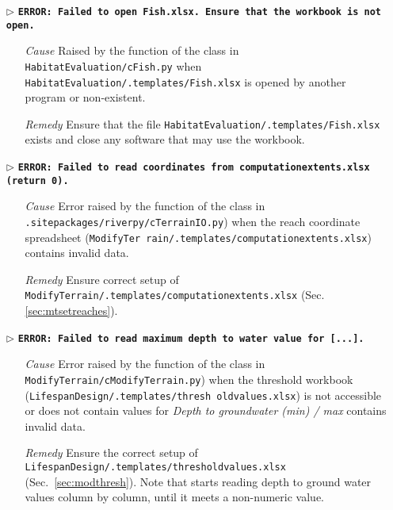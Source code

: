 \begin{itemize}
	\item[$\triangleright$]\textbf{\texttt{ERROR: Failed to open Fish.xlsx. Ensure that the workbook is not open.}}
	\begin{itemize}
		\item[\textit{Cause}\hspace{0.27cm}] Raised by the  function of the  class in \texttt{HabitatEvaluation/cFish.py} when \\ \texttt{HabitatEvaluation/.templates/Fish.xlsx} is opened by another program or non-existent.
		\item[\textit{Remedy}] Ensure that the file \texttt{HabitatEvaluation/.templates/Fish.xlsx} exists and close any software that may use the workbook.\\
	\end{itemize}
	
	\item[$\triangleright$]\textbf{\texttt{ERROR: Failed to read coordinates from computation{\myUnderscore}extents.xlsx (return 0).}}
	\begin{itemize}
		\item[\textit{Cause}\hspace{0.27cm}] Error raised by the  function of the  class in \texttt{.site{\myUnderscore}packages/riverpy/cTerrainIO.py}) when the reach coordinate spreadsheet (\texttt{ModifyTer rain/.templates/computation{\myUnderscore}extents.xlsx}) contains invalid data.
		\item[\textit{Remedy}] Ensure correct setup of \texttt{ModifyTerrain/.templates/computation{\myUnderscore}extents.xlsx} (Sec. \ref{sec:mtsetreaches}).\\
	\end{itemize}
	
	\item[$\triangleright$]\textbf{\texttt{ERROR: Failed to read maximum depth to water value for [...].}}
	\begin{itemize}
		\item[\textit{Cause}\hspace{0.27cm}] Error raised by the  function of the  class in \texttt{ModifyTerrain/cModifyTerrain.py}) when the threshold workbook (\texttt{LifespanDesign/.templates/thresh old{\myUnderscore}values.xlsx}) is not accessible or does not contain values for \textit{Depth to groundwater (min) / max}  contains invalid data.
		\item[\textit{Remedy}] Ensure the correct setup of \texttt{LifespanDesign/.templates/threshold{\myUnderscore}values.xlsx} (Sec.~\ref{sec:modthresh}). Note that  starts reading depth to ground water values column by column, until it meets a non-numeric value.\\
	\end{itemize}
	

\end{itemize}
